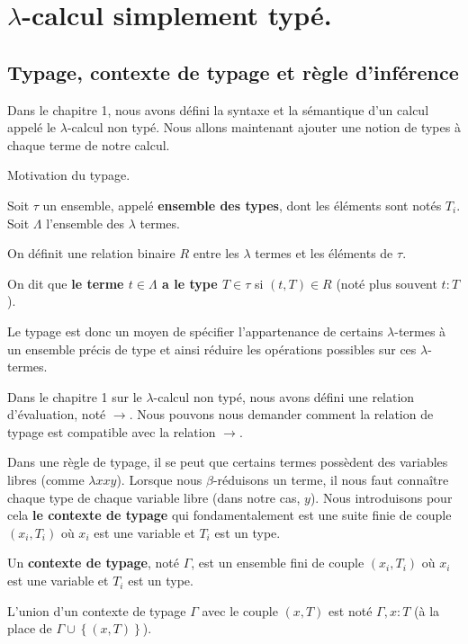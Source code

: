 \chapter{$\lambda$-calcul simplement typé.}

\section{Typage, contexte de typage et règle d'inférence}

Dans le chapitre 1, nous avons défini la syntaxe et la sémantique d'un calcul
appelé le $\lambda$-calcul non typé. Nous allons maintenant ajouter une notion de types à
chaque terme de notre calcul.

Motivation du typage.

\begin{definition} 
  Soit $\tau$ un ensemble, appelé \textbf{ensemble des types}, dont les éléments
  sont notés $T_{i}$.
  Soit $\Lambda$ l'ensemble des $\lambda$ termes.

  On définit une relation binaire $R$ entre les
  $\lambda$ termes et les éléments de $\tau$.
  
  On dit que \textbf{le terme $t \in \Lambda$ a le type $T \in \tau$} si $(t, T)
  \in R$ (noté plus souvent $t : T$).
\end{definition}

Le typage est donc un moyen de spécifier l'appartenance de certains
$\lambda$-termes à un ensemble précis de type et ainsi réduire les opérations
possibles sur ces $\lambda$-termes.

Dans le chapitre 1 sur le $\lambda$-calcul non typé, nous avons défini une
relation d'évaluation, noté $\rightarrow$. Nous pouvons nous demander comment la
relation de typage est compatible avec la relation $\rightarrow$.

Dans une règle de typage, il se peut que certains termes possèdent des variables
libres (comme $\lambda x x y$). Lorsque nous $\beta$-réduisons un terme, il nous
faut connaître chaque type de chaque variable libre (dans notre cas, $y$). Nous
introduisons pour cela \textbf{le contexte de typage} qui fondamentalement est
une suite finie de couple $(x_{i}, T_{i})$ où $x_{i}$ est une variable et
$T_{i}$ est un type.

\begin{definition} 
  Un \textbf{contexte de typage}, noté $\Gamma$, est un ensemble fini de couple $(x_{i},
  T_{i})$ où $x_{i}$ est une variable et $T_{i}$ est un type.
  
  L'union d'un contexte de typage $\Gamma$ avec le couple $(x, T)$ est noté
  $\Gamma, x : T$ (à la place de $\Gamma \cup \left\{(x, T)\right\}$).
\end{definition}

